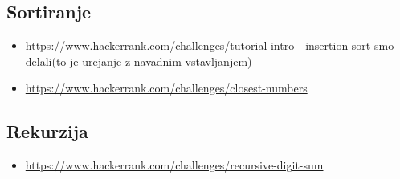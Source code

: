 \documentclass{article}
\begin{document}
		\subsection{Sortiranje}
			\begin{itemize}
				\item \url{https://www.hackerrank.com/challenges/tutorial-intro} - insertion sort smo delali(to je urejanje z navadnim vstavljanjem)
				\item \url{https://www.hackerrank.com/challenges/closest-numbers}
			\end{itemize}

		\subsection{Rekurzija}
			\begin{itemize}
				\item \url{https://www.hackerrank.com/challenges/recursive-digit-sum}
			\end{itemize}
\end{document}
